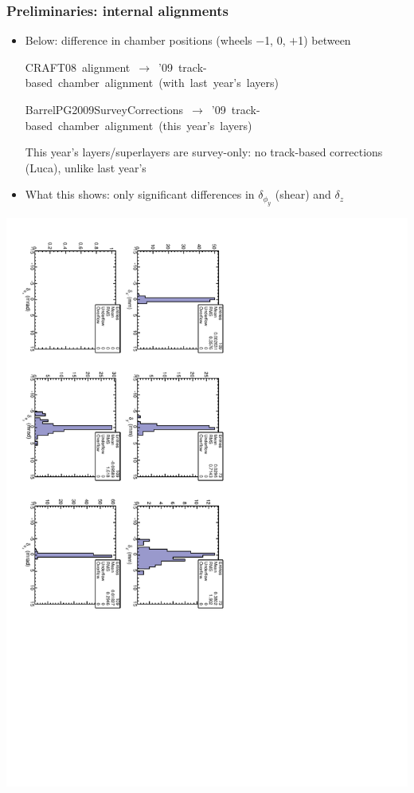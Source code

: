 \documentclass[compress]{beamer}
\begin{document}
\begin{frame}
\frametitle{Preliminaries: internal alignments}
\begin{itemize}
\item Below: difference in chamber positions (wheels $-$1, 0, $+$1) between

\hspace{-1.25 cm}\mbox{\scriptsize CRAFT08 alignment $\to$ '09 track-based chamber alignment (with last year's layers)}

\hspace{-1.25 cm}\mbox{\scriptsize BarrelPG2009SurveyCorrections $\to$ '09 track-based chamber alignment (this year's layers)\hspace{-1 cm}}

This year's layers/superlayers are survey-only: no track-based corrections (Luca), unlike last year's

\item What this shows: only significant differences in $\delta_{\phi_y}$ (shear) and $\delta_z$
\end{itemize}

\centering
\includegraphics[height=0.85\linewidth, angle=90]{diff_from08-pgsurvey.pdf}
\end{frame}
\end{document}
